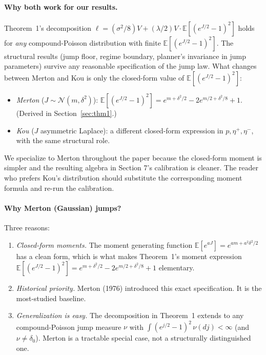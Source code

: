 \documentclass[11pt]{article}
\theoremstyle{definition}
\theoremstyle{remark}
\newcommand{\E}{\mathbb{E}}
\newcommand{\1}{\mathbf{1}}
\begin{document}
\paragraph{Why both work for our results.}
Theorem~1's decomposition $\ell = (\sigma^2/8) V + (\lambda/2) V \cdot \E[(e^{J/2}-1)^2]$ holds for \emph{any} compound-Poisson distribution with finite $\E[(e^{J/2}-1)^2]$. The structural results (jump floor, regime boundary, planner's invariance in jump parameters) survive any reasonable specification of the jump law. What changes between Merton and Kou is only the closed-form value of $\E[(e^{J/2}-1)^2]$:
\begin{itemize}[leftmargin=2em]
\item \emph{Merton} ($J \sim \mathcal{N}(m,\delta^2)$): $\E[(e^{J/2}-1)^2] = e^{m+\delta^2/2} - 2 e^{m/2 + \delta^2/8} + 1$. \\ (Derived in Section~\ref{sec:thm1}.)
\item \emph{Kou} ($J$ asymmetric Laplace): a different closed-form expression in $p, \eta^+, \eta^-$, with the same structural role.
\end{itemize}
We specialize to Merton throughout the paper because the closed-form moment is simpler and the resulting algebra in Section 7's calibration is cleaner. The reader who prefers Kou's distribution should substitute the corresponding moment formula and re-run the calibration.

\paragraph{Why Merton (Gaussian) jumps?}
Three reasons:
\begin{enumerate}[leftmargin=2em]
\item \emph{Closed-form moments.} The moment generating function $\E[e^{aJ}] = e^{am + a^2\delta^2/2}$ has a clean form, which is what makes Theorem~1's moment expression $\E[(e^{J/2}-1)^2] = e^{m+\delta^2/2} - 2 e^{m/2 + \delta^2/8} + 1$ elementary.
\item \emph{Historical priority.} Merton (1976) introduced this exact specification. It is the most-studied baseline.
\item \emph{Generalization is easy.} The decomposition in Theorem~1 extends to any compound-Poisson jump measure $\nu$ with $\int (e^{j/2}-1)^2\,\nu(dj) < \infty$ (and $\nu \neq \delta_0$). Merton is a tractable special case, not a structurally distinguished one.
\end{enumerate}
\end{document}
